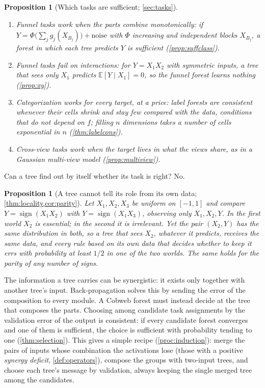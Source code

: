 \documentclass[11pt]{article}
\newtheorem{proposition}[theorem]{Proposition}
\theoremstyle{definition}
\theoremstyle{remark}
\newcommand{\E}{\mathbb{E}}
\begin{document}
\begin{proposition}[Which tasks are sufficient; \cref{sec:tasks}]\label{prop:main-tasks}
\leavevmode
\begin{enumerate}[label=(\alph*),leftmargin=*,noitemsep]
\item \emph{Funnel tasks work when the parts combine monotonically}: if
  $Y=\Phi\bigl(\sum_jg_j(X_{B_j})\bigr)+\text{noise}$ with $\Phi$ increasing and
  independent blocks $X_{B_j}$, a forest in which each tree predicts $Y$ is sufficient
  (\cref{prop:suffclass}).
\item \emph{Funnel tasks fail on interactions}: for $Y=X_1X_2$ with symmetric inputs, a
  tree that sees only $X_1$ predicts $\E[Y\mid X_1]=0$, so the funnel forest learns
  nothing (\cref{prop:xy}).
\item \emph{Categorization works for every target, at a price}: label forests are
  consistent whenever their cells shrink and stay few compared with the data, conditions
  that do not depend on $f$; filling $n$ dimensions takes a number of cells exponential
  in $n$ (\cref{thm:labelcons}).
\item \emph{Cross-view tasks work when the target lives in what the views share}, as in a
  Gaussian multi-view model (\cref{prop:multiview}).
\end{enumerate}
\end{proposition}

Can a tree find out by itself whether its task is right?  No.

\begin{proposition}[A tree cannot tell its role from its own data;
\cref{thm:locality,cor:parity}]\label{prop:main-local}
Let $X_1,X_2,X_3$ be uniform on $[-1,1]$ and compare $Y=\operatorname{sign}(X_1X_2)$ with
$Y=\operatorname{sign}(X_1X_3)$, observing only $X_1,X_2,Y$.  In the first world $X_2$
is essential; in the second it is irrelevant.  Yet the pair $(X_2,Y)$ has the same
distribution in both, so a tree that sees $X_2$, whatever it predicts, receives the same
data, and every rule based on its own data that decides whether to keep it errs with
probability at least $1/2$ in one of the two worlds.  The same holds
for the parity of any number of signs.
\end{proposition}

The information a tree carries can be synergistic: it exists only together with another
tree's input.  Back-propagation solves this by sending the error of the composition to
every module.  A Cobweb forest must instead decide at the tree that composes the parts.
Choosing among candidate
task assignments by the validation error of the output is
consistent: if every candidate forest converges and one of them is sufficient, the
choice is sufficient with probability tending to one (\cref{thm:selection}).  This gives a simple recipe
(\cref{proc:induction}): merge the pairs of inputs whose combination the activations lose
(those with a positive \emph{synergy deficit}, \cref{def:operators}), compose the groups
with two-input trees, and choose each tree's message by validation, always keeping the
single merged tree among the candidates.
\end{document}
